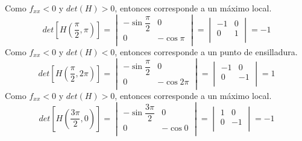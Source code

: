 \documentclass[a4paper,12pt]{article}
\begin{document}
		Como $f_{xx} < 0$ y $det(H) > 0$, entonces corresponde a un máximo local.\\
		$$det[H(\frac{\pi}{2}, \pi)] =
			\begin{vmatrix}
				-\sin \dfrac{\pi}{2} & 0 \\
				0  & - \cos \pi \\
			\end{vmatrix} =
			\begin{vmatrix}
				-1 & 0 \\
				 0 & 1 \\
			\end{vmatrix} = -1$$
		Como $f_{xx} < 0$ y $det(H) < 0$, entonces corresponde a un punto de ensilladura.\\
		$$det[H(\frac{\pi}{2}, 2\pi)] =
			\begin{vmatrix}
				-\sin \dfrac{\pi}{2} & 0 \\
				0  & - \cos 2\pi \\
			\end{vmatrix} =
			\begin{vmatrix}
				-1 & 0 \\
				 0 & -1 \\
			\end{vmatrix} = 1$$
		Como $f_{xx} < 0$ y $det(H) > 0$, entonces corresponde a un máximo local.\\


		$$det[H(\frac{3\pi}{2}, 0)] =
			\begin{vmatrix}
				-\sin \dfrac{3\pi}{2} & 0 \\
				0  & - \cos 0 \\
			\end{vmatrix} =
			\begin{vmatrix}
				1 & 0 \\
				 0 & -1 \\
			\end{vmatrix} = -1$$
\end{document}

